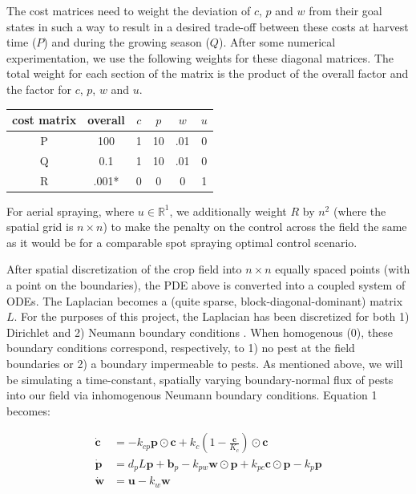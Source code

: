 \documentclass[11pt]{article}
\begin{document}
The cost matrices need to weight the deviation of $c$, $p$ and $w$ from their goal states in such a way to result in a desired trade-off between these costs at harvest time ($P$) and during the growing season ($Q$). After some numerical experimentation, we use the following weights for these diagonal matrices. The total weight for each section of the matrix is the product of the overall factor and the factor for $c$, $p$, $w$ and $u$.

\begin{center}
	\begin{tabular}{ | c | c | c | c | c | c | }
	\hline
    cost matrix & overall & $c$ & $p$ & $w$ & $u$ \\
    \hline
    P & 100 & 1 & 10 & .01 & 0 \\
    \hline
    Q & 0.1 & 1 & 10 & .01 & 0 \\
    \hline
    R & .001* & 0 & 0 & 0 & 1 \\
    \hline
    \end{tabular}
\end{center}

For aerial spraying, where $u \in \mathbb{R}^{1}$, we additionally weight $R$ by $n^2$ (where the spatial grid is $n \times n$) to make the penalty on the control across the field the same as it would be for a comparable spot spraying optimal control scenario.

After spatial discretization of the crop field into $n \times n$ equally spaced points (with a point on the boundaries), the PDE above is converted into a coupled system of ODEs. The Laplacian becomes a (quite sparse, block-diagonal-dominant) matrix $L$. For the purposes of this project, the Laplacian has been discretized for both 1) Dirichlet and 2) Neumann boundary conditions \cite{R5}. When homogenous (0), these boundary conditions correspond, respectively, to 1) no pest at the field boundaries or 2) a boundary impermeable to pests. As mentioned above, we will be simulating a time-constant, spatially varying boundary-normal flux of pests into our field via inhomogenous Neumann boundary conditions. Equation 1 becomes:

\begin{align}
\dot{\bm{c}} &= -k_{cp} \bm{p} \odot \bm{c} + k_c \left( 1 - \frac{\bm{c}}{K_c} \right) \odot \bm{c} \nonumber \\ 
\dot{\bm{p}} &= d_p L \bm{p} + \bm{b}_p - k_{pw} \bm{w} \odot \bm{p} + k_{pc} \bm{c} \odot \bm{p} - k_p \bm{p} \\
\dot{\bm{w}} &= \bm{u} - k_w \bm{w} \nonumber
\end{align}
\end{document}
